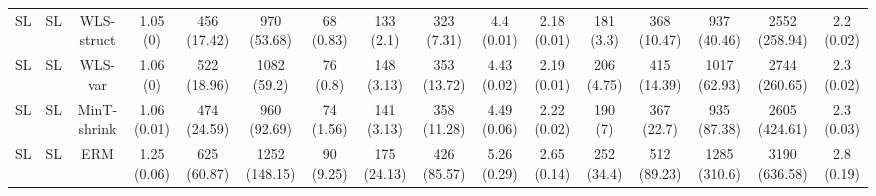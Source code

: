 \documentclass[preprint, 3p, times, twocolumn]{elsarticle}
\begin{document}
\begin{table}
\begin{center}
{{\begin{tabular}{l c cccccccccccccc}
    \hspace{0.1cm} 	SL	&SL	&WLS-struct	&1.05 (0)	&456 (17.42)	&970 (53.68)	&68 (0.83)	&133 (2.1)	&323 (7.31)	&4.4 (0.01)	&2.18 (0.01)	&181 (3.3)	&368 (10.47)	&937 (40.46)	&2552 (258.94)	&2.2 (0.02)	\\
    \hspace{0.1cm} 	SL	&SL	&WLS-var	&1.06 (0)	&522 (18.96)	&1082 (59.2)	&76 (0.8)	&148 (3.13)	&353 (13.72)	&4.43 (0.02)	&2.19 (0.01)	&206 (4.75)	&415 (14.39)	&1017 (62.93)	&2744 (260.65)	&2.3 (0.02)	\\
    \hspace{0.1cm} 	SL	&SL	&MinT-shrink	&1.06 (0.01)	&474 (24.59)	&960 (92.69)	&74 (1.56)	&141 (3.13)	&358 (11.28)	&4.49 (0.06)	&2.22 (0.02)	&190 (7)	&367 (22.7)	&935 (87.38)	&2605 (424.61)	&2.3 (0.03)	\\
    \hspace{0.1cm} 	SL	&SL	&ERM	&1.25 (0.06)	&625 (60.87)	&1252 (148.15)	&90 (9.25)	&175 (24.13)	&426 (85.57)	&5.26 (0.29)	&2.65 (0.14)	&252 (34.4)	&512 (89.23)	&1285 (310.6)	&3190 (636.58)	&2.8 (0.19)	\\   
    
    \bottomrule
    
  \end{tabular}}}
    \end{center}
    \end{table}
\end{document}
